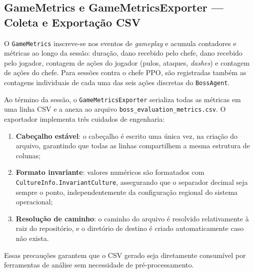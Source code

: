 \subsection{GameMetrics e GameMetricsExporter --- Coleta e Exportação CSV}
\label{subsec:game-metrics}

O \texttt{GameMetrics} inscreve-se nos eventos de \textit{gameplay} e
acumula contadores e métricas ao longo da sessão: duração, dano recebido pelo
chefe, dano recebido pelo jogador, contagem de ações do jogador (pulos,
ataques, \textit{dashes}) e contagem de ações do chefe. Para sessões contra o
chefe PPO, são registradas também as contagens individuais de cada uma das
seis ações discretas do \texttt{BossAgent}.

Ao término da sessão, o \texttt{GameMetricsExporter} serializa todas as
métricas em uma linha CSV e a anexa ao arquivo
\texttt{boss\_evaluation\_metrics.csv}. O exportador implementa três
cuidados de engenharia:

\begin{enumerate}
    \item \textbf{Cabeçalho estável}: o cabeçalho é escrito uma única vez, na
          criação do arquivo, garantindo que todas as linhas compartilhem a
          mesma estrutura de colunas;
    \item \textbf{Formato invariante}: valores numéricos são formatados com
          \texttt{CultureInfo.InvariantCulture}, assegurando que o separador
          decimal seja sempre o ponto, independentemente da configuração
          regional do sistema operacional;
    \item \textbf{Resolução de caminho}: o caminho do arquivo é resolvido
          relativamente à raiz do repositório, e o diretório de destino é
          criado automaticamente caso não exista.
\end{enumerate}

Essas precauções garantem que o CSV gerado seja diretamente consumível por
ferramentas de análise sem necessidade de pré-processamento.

